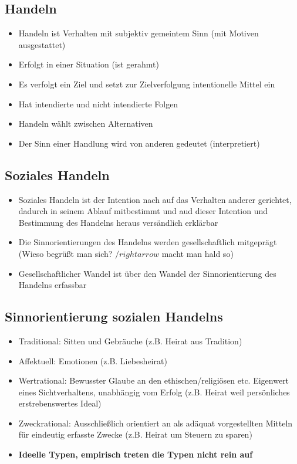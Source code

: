 \documentclass{scrartcl}
\begin{document}
\subsection*{Handeln}
\begin{itemize}
    \item
        Handeln ist Verhalten mit subjektiv gemeintem Sinn (mit Motiven ausgestattet)
    \item
        Erfolgt in einer Situation (ist gerahmt)
    \item
        Es verfolgt ein Ziel und setzt zur Zielverfolgung intentionelle Mittel ein
    \item
        Hat intendierte und nicht intendierte Folgen
    \item
        Handeln wählt zwischen Alternativen
    \item
        Der Sinn einer Handlung wird von anderen gedeutet (interpretiert)
\end{itemize}
\subsection*{Soziales Handeln}
\begin{itemize}
    \item
        Soziales Handeln ist der Intention nach auf das Verhalten anderer gerichtet, dadurch in seinem Ablauf mitbestimmt und aud dieser Intention und Bestimmung des Handelns heraus versändlich erklärbar
    \item
        Die Sinnorientierungen des Handelns werden gesellschaftlich mitgeprägt (Wieso begrüßt man sich? $/rightarrow$ macht man hald so)
    \item
        Gesellschaftlicher Wandel ist über den Wandel der Sinnorientierung des Handelns erfassbar
\end{itemize}
\subsection*{Sinnorientierung sozialen Handelns}
\begin{itemize}
    \item
        Traditional: Sitten und Gebräuche (z.B. Heirat aus Tradition)
    \item
        Affektuell: Emotionen (z.B. Liebesheirat)
    \item
        Wertrational: Bewusster Glaube an den ethischen/religiösen etc. Eigenwert eines Sichtverhaltens, unabhängig vom Erfolg (z.B. Heirat weil persönliches erstrebenswertes Ideal)
    \item
        Zweckrational: Ausschließlich orientiert an als adäquat vorgestellten Mitteln für eindeutig erfasste Zwecke (z.B. Heirat um Steuern zu sparen)
    \item
        \textbf{Ideelle Typen, empirisch treten die Typen nicht rein auf}
\end{itemize}
\end{document}
